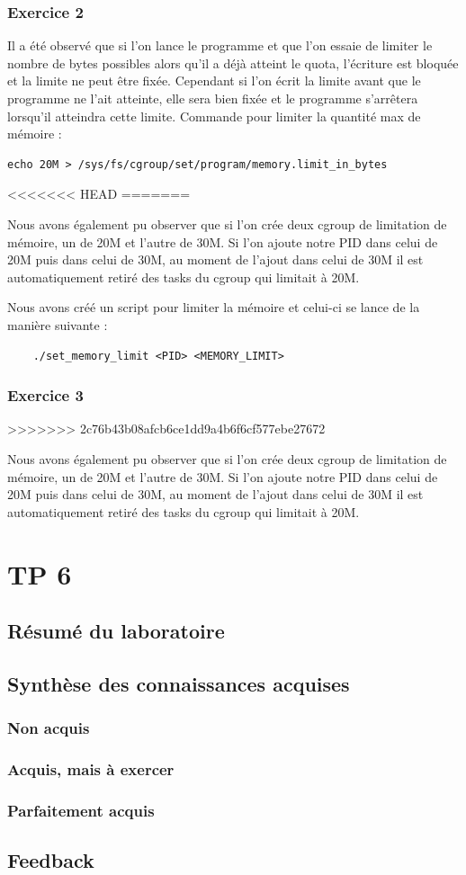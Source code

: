 \documentclass{ReportTemplate}
\begin{document}
\subsection{Exercice 2}
Il a été observé que si l'on lance le programme et que l'on essaie de limiter le
nombre de bytes possibles alors qu'il a déjà atteint le quota, l'écriture est
bloquée et la limite ne peut être fixée. Cependant si l'on écrit la limite avant
que le programme ne l'ait atteinte, elle sera bien fixée et le programme
s'arrêtera lorsqu'il atteindra cette limite.\newline
Commande pour limiter la quantité max de mémoire :
\begin{verbatim}
echo 20M > /sys/fs/cgroup/set/program/memory.limit_in_bytes
\end{verbatim}
<<<<<<< HEAD
=======

Nous avons également pu observer que si l'on crée deux cgroup de limitation de
mémoire, un de 20M et l'autre de 30M. Si l'on ajoute notre PID dans celui de 20M
puis dans celui de 30M, au moment de l'ajout dans celui de 30M il est
automatiquement retiré des tasks du cgroup qui limitait à 20M.\newline

Nous avons créé un script pour limiter la mémoire et celui-ci se lance de la
manière suivante : 
\begin{verbatim}
    ./set_memory_limit <PID> <MEMORY_LIMIT>
\end{verbatim}

\subsection{Exercice 3}
>>>>>>> 2c76b43b08afcb6ce1dd9a4b6f6cf577ebe27672

Nous avons également pu observer que si l'on crée deux cgroup de limitation de
mémoire, un de 20M et l'autre de 30M. Si l'on ajoute notre PID dans celui de 20M
puis dans celui de 30M, au moment de l'ajout dans celui de 30M il est
automatiquement retiré des tasks du cgroup qui limitait à 20M.

\chapter{TP 6}
\section{Résumé du laboratoire}

\section{Synthèse des connaissances acquises}
\subsection{Non acquis}

\subsection{Acquis, mais à exercer}

\subsection{Parfaitement acquis}

\section{Feedback}
\end{document}
